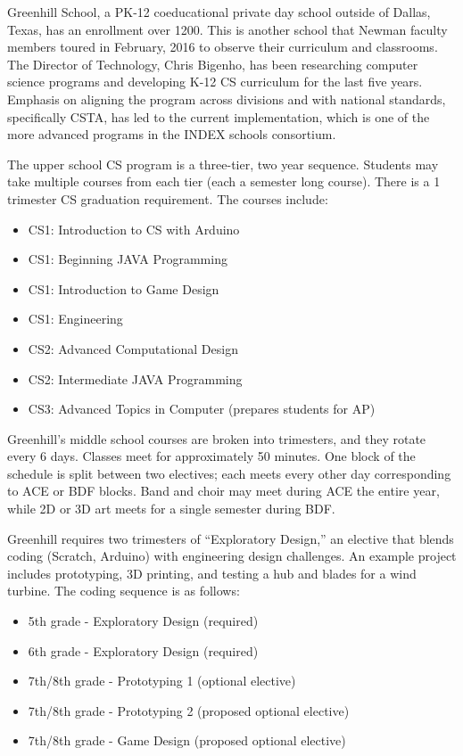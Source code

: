 Greenhill School, a PK-12 coeducational private day school outside of Dallas, Texas, has an enrollment over 1200. This is another school that Newman faculty members toured in February, 2016 to observe their curriculum and classrooms. The Director of Technology, Chris Bigenho, has been researching computer science programs and developing K-12 CS curriculum for the last five years. Emphasis on aligning the program across divisions and with national standards, specifically CSTA, has led to the current implementation, which is one of the more advanced programs in the INDEX schools consortium. \par 
The upper school CS program is a three-tier, two year sequence. Students may take multiple courses from each tier (each a semester long course). There is a 1 trimester CS graduation requirement. The courses include:
\begin{itemize} 
	\item CS1: Introduction to CS with Arduino
	\item CS1: Beginning JAVA Programming 
	\item CS1: Introduction to Game Design 
	\item CS1: Engineering
	\item CS2: Advanced Computational Design
	\item CS2: Intermediate JAVA Programming
	\item CS3: Advanced Topics in Computer (prepares students for AP)
\end{itemize}
Greenhill’s middle school courses are broken into trimesters, and they rotate every 6 days. Classes meet for approximately 50 minutes. One block of the schedule is split between two electives; each meets every other day corresponding to ACE or BDF blocks. Band and choir may meet during ACE the entire year, while 2D or 3D art meets for a single semester during BDF. \par
Greenhill requires two trimesters of ``Exploratory Design,'' an elective that blends coding (Scratch, Arduino) with engineering design challenges. An example project includes prototyping, 3D printing, and testing a hub and blades for a wind turbine. The coding sequence is as follows:
\begin{itemize}
	\item 5th grade - Exploratory Design (required)
	\item 6th grade - Exploratory Design (required)
	\item 7th/8th grade - Prototyping 1 (optional elective)
	\item 7th/8th grade - Prototyping 2 (proposed optional elective)
	\item 7th/8th grade - Game Design (proposed optional elective)
\end{itemize}
